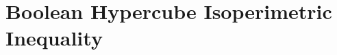 \documentclass[11pt]{article}
\theoremstyle{plain}
\theoremstyle{definition}
\theoremstyle{remark}
\newcommand{\inner}[2]{\left\langle #1,#2\right\rangle}
\def\*#1{\boldsymbol{#1}} %
\def\oE{\mathop{\mathbb{E}}}
\newcommand{\E}[2][]{ \ifthenelse{\isempty{#1}}
  {\oE\left[#2\right]}
  {\oE_{#1}\left[#2\right]} }
\begin{document}


\newpage
\section{Boolean Hypercube Isoperimetric Inequality}
\end{document}
